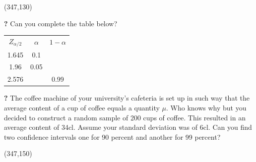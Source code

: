 \documentclass{article}
\newcommand{\forceindent}{\leavevmode{\parindent=2em\indent}}
\begin{document}
\framebox(347,130){}

\forceindent \textbf{?} Can you complete the table below?

\begin{table}[H]
	\centering
	\begin{large}
		\begin{tabular}{ccc}
			\underline{$Z_{\alpha/2}$} & \underline{$\alpha$} & \underline{$1-\alpha$} \\
			1.645          & 0.1          &           \\
			1.96          & 0.05          &           \\
			2.576         &          & 0.99        
		\end{tabular}
	\end{large}
\end{table}

\forceindent \textbf{?} The coffee machine of your university's cafeteria is set up in such way that the average content of a cup of coffee equals a quantity $\mu$. Who knows why but you decided to construct a random sample of 200 cups of coffee. This resulted in an average content of 34cl. Assume your standard deviation was of 6cl. Can you find two confidence intervals one for 90 percent and another for 99 percent?

\framebox(347,150){}
\end{document}
